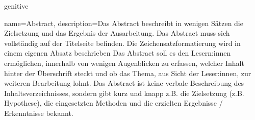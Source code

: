 \makeglossaries
\iffalse
	\newglossarystyle{manualfixedwidth}{
	\setglossarystyle{long3colheader} %
	\newcolumntype{R}{>{\raggedleft\arraybackslash}p{2cm}}
	\setlength\LTleft{-5pt}
	\renewenvironment{theglossary}%
	{\begin{longtable}{p{4cm}p{10cm}R}} %
			{\end{longtable}}%
	}
\fi



\renewcommand*{\entryname}{Wort/Abkürzung}
\renewcommand*{\descriptionname}{Beschreibung}
\renewcommand*{\pagelistname}{Seite(n)}
\setlength{\glsdescwidth}{0.75\textwidth}
\glsenablehyper
\renewcommand*{\glsclearpage}{}
\renewcommand{\acronymname}{Abkürzungsverzeichnis}

\glsaddkey
{genitive}%
{}%
{\glsentrygenitive}%
{\Glsentrygenitive}%
{\glsgen}%
{\Glsgen}%
{\GLSgen}%


{
	name=Abstract,
	description={Das Abstract beschreibt in wenigen Sätzen die Zielsetzung und das Ergebnis der Ausarbeitung. Das Abstract muss sich vollständig auf der Titelseite befinden. Die Zeichensatzformatierung wird in einem eigenen Absatz beschrieben  Das Abstract soll es den Lesern:innen ermöglichen, innerhalb von wenigen Augenblicken zu erfassen, welcher Inhalt hinter der Überschrift steckt und ob das Thema, aus Sicht der Leser:innen, zur weiteren Bearbeitung lohnt. Das Abstract ist keine verbale Beschreibung des Inhaltsverzeichnisses, sondern gibt kurz und knapp z.B. die Zielsetzung (z.B. Hypothese), die eingesetzten Methoden und die erzielten Ergebnisse / Erkenntnisse bekannt.}
}


